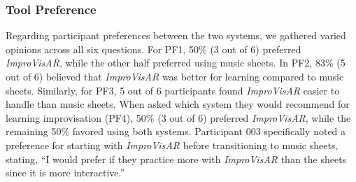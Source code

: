 \documentclass{vgtc}                          %
\begin{document}

\subsubsection{Tool Preference}

\par %
Regarding participant preferences between the two systems, we gathered varied opinions across all six questions. For PF1, 50\% (3 out of 6) preferred \textit{ImproVisAR}, while the other half preferred using music sheets. In PF2, 83\% (5 out of 6) believed that \textit{ImproVisAR} was better for learning compared to music sheets. Similarly, for PF3, 5 out of 6 participants found \textit{ImproVisAR} easier to handle than music sheets.
When asked which system they would recommend for learning improvisation (PF4), 50\% (3 out of 6) preferred \textit{ImproVisAR}, while the remaining 50\% favored using both systems. Participant 003 specifically noted a preference for starting with \textit{ImproVisAR} before transitioning to music sheets, stating, ``I would prefer if they practice more with \textit{ImproVisAR} than the sheets since it is more interactive.''
\end{document}
